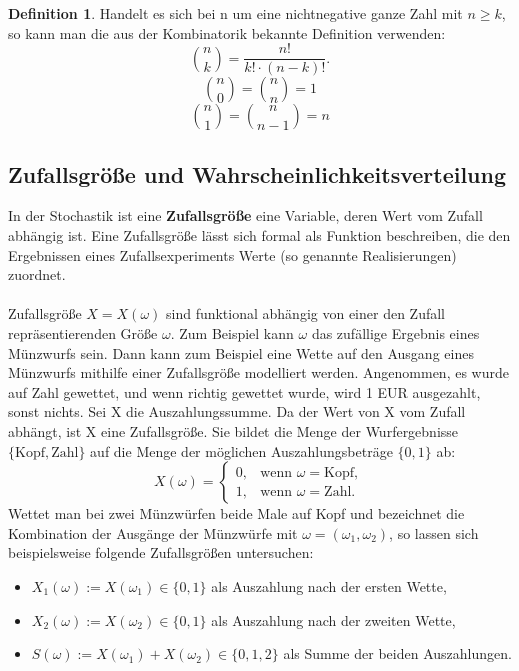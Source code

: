 \documentclass[a4paper,10pt,DIV9, BCOR12mm, oneside,openright,openbib]{scrreprt}
\theoremstyle{definition}
\newtheorem{mydef}{Definition}[section]
\theoremstyle{plain}
\begin{document}
\begin{mydef}
Handelt es sich bei n um eine nichtnegative ganze Zahl mit $ n\geq k $, so kann man die aus der Kombinatorik bekannte Definition verwenden:
 \[ \binom nk = \frac{n!}{k! \cdot (n-k)!}. \]
 \[ \binom n0 = \binom nn = 1 \]
 \[ \binom n1 = \binom n{n-1} = n \]

\end{mydef}


\subsection{Zufallsgröße und Wahrscheinlichkeitsverteilung}
In der Stochastik ist eine \textbf{Zufallsgröße} eine Variable, deren Wert vom Zufall abhängig ist. Eine Zufallsgröße lässt sich formal als Funktion beschreiben, die den Ergebnissen eines Zufallsexperiments Werte (so genannte Realisierungen) zuordnet.\\
\\
Zufallsgröße $ X = X(\omega) $ sind funktional abhängig von einer den Zufall repräsentierenden Größe $ \omega $. Zum Beispiel kann $ \omega $ das zufällige Ergebnis eines Münzwurfs sein. Dann kann zum Beispiel eine Wette auf den Ausgang eines Münzwurfs mithilfe einer Zufallsgröße modelliert werden. Angenommen, es wurde auf Zahl gewettet, und wenn richtig gewettet wurde, wird 1 EUR ausgezahlt, sonst nichts. Sei X die Auszahlungssumme. Da der Wert von X vom Zufall abhängt, ist X eine Zufallsgröße. Sie bildet die Menge der Wurfergebnisse $ \{\text{Kopf}, \text{Zahl}\} $ auf die Menge der möglichen Auszahlungsbeträge $ \{0, 1\} $ ab:
\[  X(\omega) = \begin{cases} 0, & \text{wenn }\omega = \text{Kopf},\\ 1, & \text{wenn }\omega = \text{Zahl}. \end{cases}  \]
Wettet man bei zwei Münzwürfen beide Male auf Kopf und bezeichnet die Kombination der Ausgänge der Münzwürfe mit $ \omega=\left(\omega_1,\omega_2\right) $, so lassen sich beispielsweise folgende Zufallsgrößen untersuchen:
\begin{itemize}
\item $ X_1(\omega) := X(\omega_1) \in\{0,1\} $ als Auszahlung nach der ersten Wette,\\
\item $ X_2(\omega) := X(\omega_2) \in\{0,1\} $ als Auszahlung nach der zweiten Wette,\\
\item $ S(\omega) := X(\omega_1) + X(\omega_2) \in\{0,1,2\} $ als Summe der beiden Auszahlungen.\\
\end{itemize}
\end{document}
